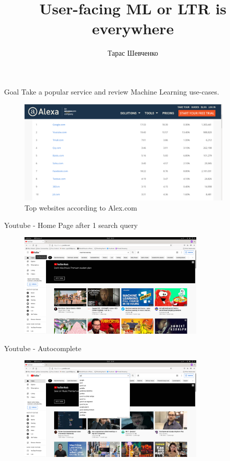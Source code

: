 \documentclass[10pt]{beamer}
\title{User-facing ML or LTR is everywhere}
\date{}
\author{Тарас Шевченко}
\institute{Senior Machine Learning Programmer at Proxet / Giphy}
\begin{document}
\maketitle



\begin{frame}{Goal}
    Take a popular service and review Machine Learning use-cases.

\begin{figure}
    \includegraphics[height=5cm]{images/alexa-top.png}
    \caption{Top websites according to Alex.com}
\end{figure}

\end{frame}


\begin{frame}{Youtube - Home Page after 1 search query}
\begin{figure}
    \includegraphics[height=5cm]{images/yt-3.png}
\end{figure}
\end{frame}

\begin{frame}{Youtube - Autocomplete}
\begin{figure}
    \includegraphics[height=5cm]{images/autocomplete.png}
\end{figure}
\end{frame}
\end{document}
